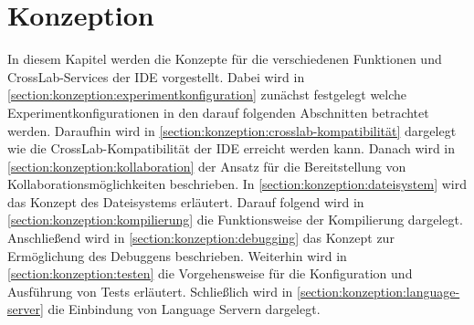 \chapter{Konzeption}\label{section:konzeption}

In diesem Kapitel werden die Konzepte für die verschiedenen Funktionen und CrossLab-Services der IDE vorgestellt. Dabei wird in \autoref{section:konzeption:experimentkonfiguration} zunächst festgelegt welche Experimentkonfigurationen in den darauf folgenden Abschnitten betrachtet werden. Daraufhin wird in \autoref{section:konzeption:crosslab-kompatibilität} dargelegt wie die CrossLab-Kompatibilität der IDE erreicht werden kann. Danach wird in \autoref{section:konzeption:kollaboration} der Ansatz für die Bereitstellung von Kollaborationsmöglichkeiten beschrieben. In \autoref{section:konzeption:dateisystem} wird das Konzept des Dateisystems erläutert. Darauf folgend wird in \autoref{section:konzeption:kompilierung} die Funktionsweise der Kompilierung dargelegt. Anschließend wird in \autoref{section:konzeption:debugging} das Konzept zur Ermöglichung des Debuggens beschrieben. Weiterhin wird in \autoref{section:konzeption:testen} die Vorgehensweise für die Konfiguration und Ausführung von Tests erläutert. Schließlich wird in \autoref{section:konzeption:language-server} die Einbindung von Language Servern dargelegt.








